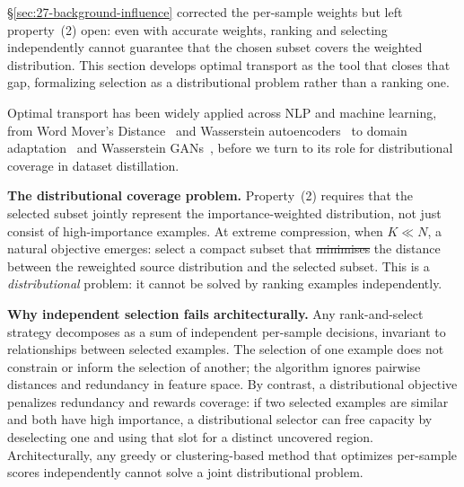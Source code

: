 \documentclass[12pt, a4paper, twoside]{book}
\makeatletter
\numberwithin{equation}{chapter}
\theoremstyle{plain}
\theoremstyle{definition}
\theoremstyle{remark}
\newenvironment{foldable}{}{}
\providecommand{\DIFaddtex}[1]{{\protect\color{blue}\uwave{#1}}} %
\providecommand{\DIFdeltex}[1]{{\protect\color{red}\sout{#1}}} %
\providecommand{\DIFaddbegin}{} %
\providecommand{\DIFaddend}{} %
\providecommand{\DIFdelbegin}{} %
\providecommand{\DIFdelend}{} %
\providecommand{\DIFadd}[1]{\texorpdfstring{\DIFaddtex{#1}}{#1}} %
\providecommand{\DIFdel}[1]{\texorpdfstring{\DIFdeltex{#1}}{}} %
\newcommand{\DIFscaledelfig}{0.5}
\newlength{\DIFdelgraphicswidth} %
\newlength{\DIFdelgraphicsheight} %
\newcommand{\DIFaddincludegraphics}[2][]{{\color{blue}\fbox{\DIFOincludegraphics[#1]{#2}}}} %
\newcommand{\DIFdelincludegraphics}[2][]{%
\sbox{\DIFdelgraphicsbox}{\DIFOincludegraphics[#1]{#2}}%
\settoboxwidth{\DIFdelgraphicswidth}{\DIFdelgraphicsbox} %
\settoboxtotalheight{\DIFdelgraphicsheight}{\DIFdelgraphicsbox} %
\scalebox{\DIFscaledelfig}{%
\parbox[b]{\DIFdelgraphicswidth}{\usebox{\DIFdelgraphicsbox}\\[-\baselineskip] \rule{\DIFdelgraphicswidth}{0em}}\llap{\resizebox{\DIFdelgraphicswidth}{\DIFdelgraphicsheight}{%
\setlength{\unitlength}{\DIFdelgraphicswidth}%
\begin{picture}(1,1)%
\thicklines\linethickness{2pt} %
{\color[rgb]{1,0,0}\put(0,0){\framebox(1,1){}}}%
{\color[rgb]{1,0,0}\put(0,0){\line( 1,1){1}}}%
{\color[rgb]{1,0,0}\put(0,1){\line(1,-1){1}}}%
\end{picture}%
}\hspace*{3pt}}} %
} %
\DeclareRobustCommand{\DIFaddbegin}{\DIFOaddbegin \let\includegraphics\DIFaddincludegraphics} %
\DeclareRobustCommand{\DIFaddend}{\DIFOaddend \let\includegraphics\DIFOincludegraphics} %
\DeclareRobustCommand{\DIFdelbegin}{\DIFOdelbegin \let\includegraphics\DIFdelincludegraphics} %
\DeclareRobustCommand{\DIFdelend}{\DIFOaddend \let\includegraphics\DIFOincludegraphics} %
\let\sout@orig\sout %
\renewcommand{\sout}[1]{\ifmmode\text{\sout@orig{\ensuremath{#1}}}\else\sout@orig{#1}\fi} %
\makeatother
\begin{document}
\S\ref{sec:27-background-influence} corrected the per-sample weights but left property~(2) open: even with accurate weights, ranking and selecting independently cannot guarantee that the chosen subset covers the weighted distribution.
This section develops optimal transport as the tool that closes that gap, formalizing selection as a distributional problem rather than a ranking one.

\begin{foldable}
  Optimal transport has been widely applied across \ac{NLP} and machine learning, from Word Mover's Distance~\cite{kusner2015word} and Wasserstein autoencoders~\cite{tolstikhin2018wasserstein} to domain adaptation~\cite{courty2016optimal} and Wasserstein \acp{GAN}~\cite{arjovsky2017wasserstein}, before we turn to its role for distributional coverage in dataset distillation.
\end{foldable}

\begin{foldable}
  \textbf{The distributional coverage problem.}
  Property~(2) requires that the selected subset jointly represent the importance-weighted distribution, not just consist of high-importance examples.
  At extreme compression, when $K \ll N$, a natural objective emerges: select a compact subset that \DIFdelbegin \DIFdel{minimises }\DIFdelend \DIFaddbegin \DIFadd{minimizes }\DIFaddend the distance between the reweighted source distribution and the selected subset.
  This is a \textit{distributional} problem: it cannot be solved by ranking examples independently.
\end{foldable}

\begin{foldable}
  \textbf{Why independent selection fails architecturally.}
  Any rank-and-select strategy decomposes as a sum of independent per-sample decisions, invariant to relationships between selected examples.
  The selection of one example does not constrain or inform the selection of another; the algorithm ignores pairwise distances and redundancy in feature space.
  By contrast, a distributional objective penalizes redundancy and rewards coverage: if two selected examples are similar and both have high importance, a distributional selector can free capacity by deselecting one and using that slot for a distinct uncovered region.
  Architecturally, any greedy or clustering-based method that optimizes per-sample scores independently cannot solve a joint distributional problem.
\end{foldable}
\end{document}
